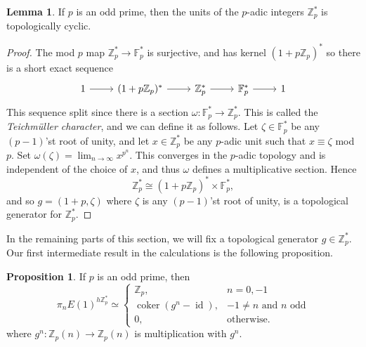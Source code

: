 \documentclass[a4paper]{article} %
\theoremstyle{definition}
\newtheorem{lemma}[theorem]{Lemma}
\newtheorem{proposition}[theorem]{Proposition}
\newcommand{\Z}{\mathbb{Z}}
\newcommand{\F}{\mathbb{F}}
\DeclareMathOperator{\id}{id}           %
\DeclareMathOperator{\coker}{coker}     %
\begin{document}
\begin{lemma}
  If $p$ is an odd prime, then the units of the $p$-adic integers $\Z_p^*$ is topologically cyclic.
\end{lemma}
\begin{proof}
The mod $p$ map $\Z_p^* \to \F_p^*$ is surjective, and has kernel $(1+p\Z_p)^*$ so there is a short exact sequence
\[
\begin{tikzcd}
1 \rar & (1+p\Z_p)^* \rar{} & \Z_p^* \rar{} & \F_p^* \rar & 1
\end{tikzcd}
\]
This sequence split since there is a section $\omega \colon \F_p^* \to \Z_p^*$. This is called the \textit{Teichmüller character}, and we can define it as follows. Let $\zeta \in \F_p^*$ be any $(p-1)$'st root of unity, and let $x \in \Z_p^*$ be any $p$-adic unit such that $x \equiv \zeta$ mod $p$. Set $\omega(\zeta) = \lim_{n \to \infty} x^{p^n}$. This converges in the $p$-adic topology and is independent of the choice of $x$,
and thus $\omega$ defines a multiplicative section. Hence
\[
\Z_p^* \cong (1 + p\Z_p)^* \times \F_p^*,
\]
and so $g = (1+p, \zeta)$ where $\zeta$ is any $(p-1)$'st root of unity, is a topological generator for $\Z_p^*$.
\end{proof}
In the remaining parts of this section, we will fix a topological generator $g \in \Z_p^*$. Our first intermediate result in the calculations is the following proposition.
\begin{proposition}
  If $p$ is an odd prime, then
  \[
   \pi_n E(1)^{h\Z_p^*} \simeq
     \begin{cases}
     \Z_p, & n=0,-1 \\
     \coker (g^n - \id), & -1 \neq n \text{ and $n$ odd} \\
     0, & \text{otherwise.}
     \end{cases}
   \]
   where $g^n \colon \Z_p(n) \to \Z_p(n)$ is multiplication with $g^n$.
\end{proposition}
\end{document}
